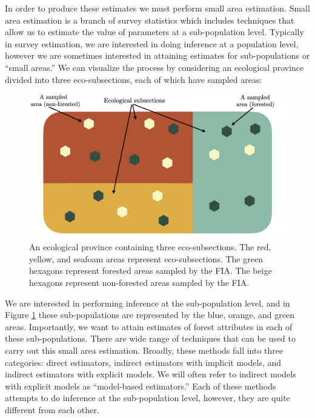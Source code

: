 \documentclass[12pt,twoside]{reedthesis}
\begin{document}
In order to produce these estimates we must perform small area estimation. Small area estimation is a branch of survey statistics which includes techniques that allow us to estimate the value of parameters at a sub-population level. Typically in survey estimation, we are interested in doing inference at a population level, however we are sometimes interested in attaining estimates for sub-populations or ``small areas.'' We can visualize the process by considering an ecological province divided into three eco-subsections, each of which have sampled areas:
\begin{figure}

{\centering \includegraphics[width=1\linewidth]{figure/ecoprov-diagram} 

}

\caption[An ecological province]{An ecological province containing three eco-subsections. The red, yellow, and seafoam areas represent eco-subsections. The green hexagons represent forested areas sampled by the FIA. The beige hexagons represent non-forested areas sampled by the FIA.}\label{fig:ecological-province-diagram}
\end{figure}
We are interested in performing inference at the sub-population level, and in Figure \ref{fig:ecological-province-diagram} these sub-populations are represented by the blue, orange, and green areas. Importantly, we want to attain estimates of forest attributes in each of these sub-populations. There are wide range of techniques that can be used to carry out this small area estimation. Broadly, these methods fall into three categories: direct estimators, indirect estimators with implicit models, and indirect estimators with explicit models. We will often refer to indirect models with explicit models as ``model-based estimators.'' Each of these methods attempts to do inference at the sub-population level, however, they are quite different from each other.
\end{document}

